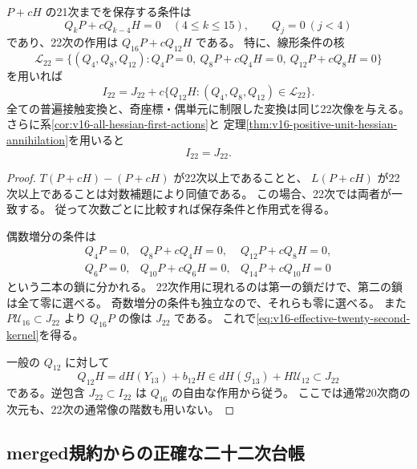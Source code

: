 \begin{proposition}[二十二次の保存条件と有効作用]
\label{prop:v16-effective-twenty-second-chain}
$P+cH$ の21次までを保存する条件は
\begin{equation}\label{eq:v16-twenty-second-preservation}
 Q_kP+cQ_{k-4}H=0\quad(4\le k\le15),\qquad Q_j=0\ (j<4)
\end{equation}
であり、22次の作用は $Q_{16}P+cQ_{12}H$ である。
特に、線形条件の核
\[
 \mathcal L_{22}=\{(Q_4,Q_8,Q_{12}):
 Q_4P=0,\ Q_8P+cQ_4H=0,\ Q_{12}P+cQ_8H=0\}
\]
を用いれば
\begin{equation}\label{eq:v16-effective-twenty-second-kernel}
 I_{22}=J_{22}
    +c\{Q_{12}H:(Q_4,Q_8,Q_{12})\in\mathcal L_{22}\}.
\end{equation}
全ての普遍接触変換と、奇座標・偶単元に制限した変換は同じ22次像を与える。
さらに系\ref{cor:v16-all-hessian-first-actions}と
定理\ref{thm:v16-positive-unit-hessian-annihilation}を用いると
\begin{equation}\label{eq:v16-effective-twenty-second-ordinary}
                         I_{22}=J_{22}.
\end{equation}
\end{proposition}

\begin{proof}
$T(P+cH)-(P+cH)$ が22次以上であることと、
$L(P+cH)$ が22次以上であることは対数補題により同値である。
この場合、22次では両者が一致する。
従って次数ごとに比較すれば保存条件と作用式を得る。

偶数増分の条件は
\[
\begin{array}{lll}
Q_4P=0,&Q_8P+cQ_4H=0,&Q_{12}P+cQ_8H=0,\\
Q_6P=0,&Q_{10}P+cQ_6H=0,&Q_{14}P+cQ_{10}H=0
\end{array}
\]
という二本の鎖に分かれる。
22次作用に現れるのは第一の鎖だけで、第二の鎖は全て零に選べる。
奇数増分の条件も独立なので、それらも零に選べる。
また $P\mathcal U_{16}\subset J_{22}$ より $Q_{16}P$ の像は $J_{22}$ である。
これで\eqref{eq:v16-effective-twenty-second-kernel}を得る。

一般の $Q_{12}$ に対して
\[
 Q_{12}H=dH(Y_{13})+b_{12}H
       \in dH(\mathcal G_{13})+H\mathcal U_{12}\subset J_{22}
\]
である。逆包含 $J_{22}\subset I_{22}$ は $Q_{16}$ の自由な作用から従う。
ここでは通常20次商の次元も、22次の通常像の階数も用いない。
\end{proof}

\subsection{merged規約からの正確な二十二次台帳}

